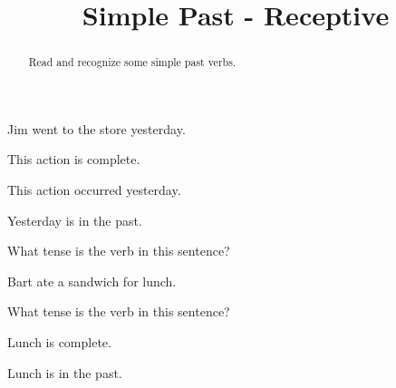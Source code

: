 \documentclass{ximera}
\title{Simple Past - Receptive}
\begin{document}
\begin{abstract}
Read and recognize some simple past verbs.
\end{abstract}
\maketitle

\begin{question}
Jim went to the store yesterday.

\begin{solution}
\begin{hint}
This action is complete.
\end{hint}
\begin{hint}
This action occurred yesterday.
\end{hint}
\begin{hint}
Yesterday is in the past.
\end{hint}
What tense is the verb in this sentence?
\end{solution}
\end{question}

\begin{question}
Bart ate a sandwich for lunch.
\begin{solution}
What tense is the verb in this sentence?
\begin{multiple-choice}
\end{multiple-choice}
\begin{hint}
Lunch is complete.
\end{hint}
\begin{hint}
Lunch is in the past.
\end{hint}
\end{solution}
\end{question}
\end{document}
